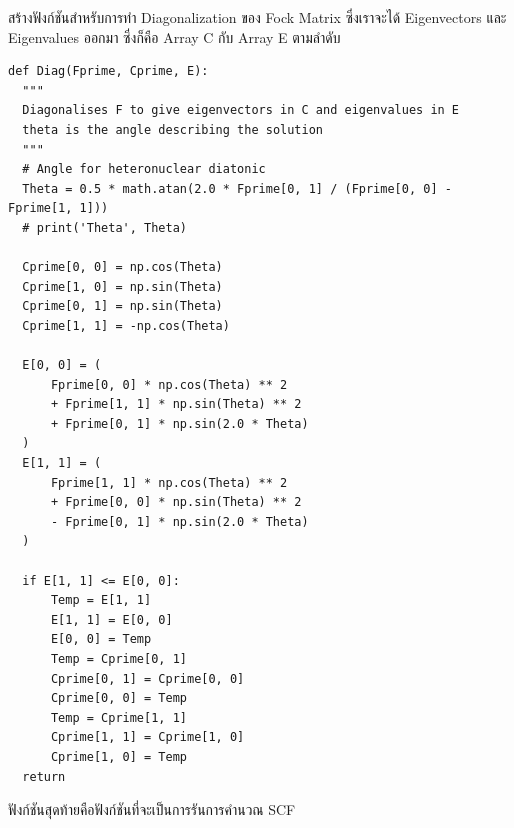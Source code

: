 \vspace{5pt}

\noindent {}

\vspace{5pt}

สร้างฟังก์ชันสำหรับการทำ Diagonalization ของ Fock Matrix ซึ่งเราจะได้ Eigenvectors และ Eigenvalues ออกมา ซึ่งก็คือ Array C กับ Array E ตามลำดับ

\vspace{5pt}

\begin{lstlisting}[style=MyPython]
def Diag(Fprime, Cprime, E):
  """
  Diagonalises F to give eigenvectors in C and eigenvalues in E
  theta is the angle describing the solution
  """
  # Angle for heteronuclear diatonic
  Theta = 0.5 * math.atan(2.0 * Fprime[0, 1] / (Fprime[0, 0] - Fprime[1, 1]))
  # print('Theta', Theta)

  Cprime[0, 0] = np.cos(Theta)
  Cprime[1, 0] = np.sin(Theta)
  Cprime[0, 1] = np.sin(Theta)
  Cprime[1, 1] = -np.cos(Theta)

  E[0, 0] = (
      Fprime[0, 0] * np.cos(Theta) ** 2
      + Fprime[1, 1] * np.sin(Theta) ** 2
      + Fprime[0, 1] * np.sin(2.0 * Theta)
  )
  E[1, 1] = (
      Fprime[1, 1] * np.cos(Theta) ** 2
      + Fprime[0, 0] * np.sin(Theta) ** 2
      - Fprime[0, 1] * np.sin(2.0 * Theta)
  )

  if E[1, 1] <= E[0, 0]:
      Temp = E[1, 1]
      E[1, 1] = E[0, 0]
      E[0, 0] = Temp
      Temp = Cprime[0, 1]
      Cprime[0, 1] = Cprime[0, 0]
      Cprime[0, 0] = Temp
      Temp = Cprime[1, 1]
      Cprime[1, 1] = Cprime[1, 0]
      Cprime[1, 0] = Temp
  return
\end{lstlisting}

\vspace{5pt}

\noindent ฟังก์ชันสุดท้ายคือฟังก์ชันที่จะเป็นการรันการคำนวณ SCF

\vspace{5pt}

